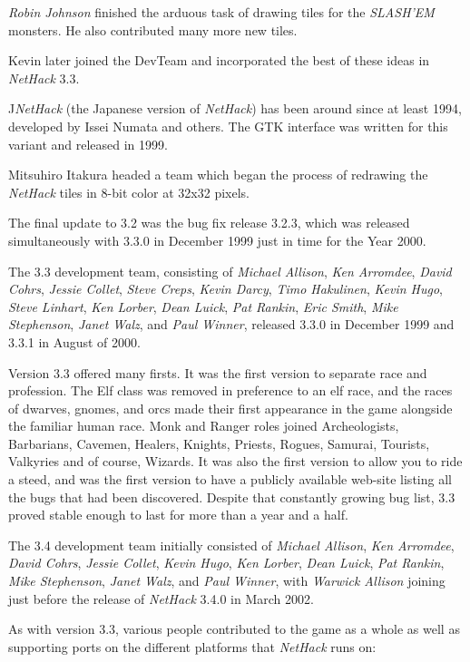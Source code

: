 {\it Robin Johnson\/} finished the arduous task of drawing tiles for the
{\it SLASH'EM\/} monsters.  He also contributed many more new tiles.

Kevin later joined the
DevTeam and incorporated the best of these ideas in {\it NetHack\/} 3.3.

J{\it NetHack\/} (the Japanese version of {\it NetHack\/}) has been around since at least
1994, developed by Issei Numata and others. The GTK interface was written
for this variant and released in 1999.

Mitsuhiro Itakura headed a team which began the process of redrawing the
{\it NetHack\/} tiles in 8-bit color at 32x32 pixels.

The final update to 3.2 was the bug fix release 3.2.3, which was released
simultaneously with 3.3.0 in December 1999 just in time for the Year 2000.

The 3.3 development team, consisting of {\it Michael Allison}, {\it Ken Arromdee}, 
{\it David Cohrs}, {\it Jessie Collet}, {\it Steve Creps}, {\it Kevin Darcy}, 
{\it Timo Hakulinen}, {\it Kevin Hugo}, {\it Steve Linhart}, {\it Ken Lorber}, 
{\it Dean Luick}, {\it Pat Rankin}, {\it Eric Smith}, {\it Mike Stephenson}, 
{\it Janet Walz}, and {\it Paul Winner}, released 3.3.0 in 
December 1999 and 3.3.1 in August of 2000.

Version 3.3 offered many firsts. It was the first version to separate race 
and profession. The Elf class was removed in preference to an elf race, 
and the races of dwarves, gnomes, and orcs made their first appearance in 
the game alongside the familiar human race.  Monk and Ranger roles joined 
Archeologists, Barbarians, Cavemen, Healers, Knights, Priests, Rogues, Samurai, 
Tourists, Valkyries and of course, Wizards.  It was also the first version
to allow you to ride a steed, and was the first version to have a publicly 
available web-site listing all the bugs that had been discovered.  Despite 
that constantly growing bug list, 3.3 proved stable enough to last for
more than a year and a half.

The 3.4 development team initially consisted of
{\it Michael Allison}, {\it Ken Arromdee},
{\it David Cohrs}, {\it Jessie Collet}, {\it Kevin Hugo}, {\it Ken Lorber},
{\it Dean Luick}, {\it Pat Rankin}, {\it Mike Stephenson}, 
{\it Janet Walz}, and {\it Paul Winner}, with {\it  Warwick Allison\/} joining 
just before the release of {\it NetHack\/} 3.4.0 in March 2002.

As with version 3.3, various people contributed to the game as a whole as
well as supporting ports on the different platforms that {\it NetHack\/} runs on:

